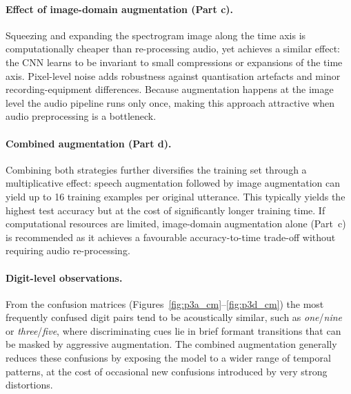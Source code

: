 \paragraph{Effect of image-domain augmentation (Part c).}
Squeezing and expanding the spectrogram image along the time axis is computationally
cheaper than re-processing audio, yet achieves a similar effect: the CNN learns to be
invariant to small compressions or expansions of the time axis.  Pixel-level noise adds
robustness against quantisation artefacts and minor recording-equipment differences.
Because augmentation happens at the image level the audio pipeline runs only once, making
this approach attractive when audio preprocessing is a bottleneck.

\paragraph{Combined augmentation (Part d).}
Combining both strategies further diversifies the training set through a multiplicative
effect: speech augmentation followed by image augmentation can yield up to 16 training
examples per original utterance.  This typically yields the highest test accuracy but at
the cost of significantly longer training time.  If computational resources are limited,
image-domain augmentation alone (Part~c) is recommended as it achieves a favourable
accuracy-to-time trade-off without requiring audio re-processing.

\paragraph{Digit-level observations.}
From the confusion matrices (Figures~\ref{fig:p3a_cm}--\ref{fig:p3d_cm}) the most
frequently confused digit pairs tend to be acoustically similar, such as
\textit{one}/\textit{nine} or \textit{three}/\textit{five}, where discriminating cues
lie in brief formant transitions that can be masked by aggressive augmentation.  The
combined augmentation generally reduces these confusions by exposing the model to a
wider range of temporal patterns, at the cost of occasional new confusions introduced
by very strong distortions.

\endgroup

